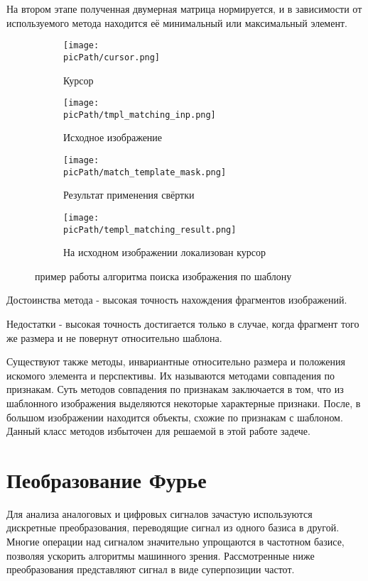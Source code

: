 \documentclass[oneside,final,14pt]{extreport}
\newcommand{\picPath}{pictures}
\begin{document}
На втором этапе полученная двумерная матрица нормируется, и в зависимости от используемого метода находится её минимальный или максимальный элемент.

\begin{figure}[H]
  \centering
  \begin{subfigure}[b]{0.2\linewidth}
    \texttt{[image: \\picPath/cursor.png]}
    \caption{ Курсор}
  \end{subfigure}
  \begin{subfigure}[b]{0.4\linewidth}
    \texttt{[image: \\picPath/tmpl\_matching\_inp.png]}
    \caption{Исходное изображение}
  \end{subfigure}
  \begin{subfigure}[b]{0.4\linewidth}
    \texttt{[image: \\picPath/match\_template\_mask.png]}
    \caption{Результат применения свёртки}
  \end{subfigure}
  \begin{subfigure}[b]{0.4\linewidth}
    \texttt{[image: \\picPath/templ\_matching\_result.png]}
    \caption{На исходном изображении локализован курсор}
  \end{subfigure}
  \caption{пример работы алгоритма поиска изображения по шаблону}
  \label{fig:coffee}
\end{figure}

Достоинства метода  - высокая точность нахождения фрагментов изображений.

Недостатки - высокая точность достигается только в случае, когда фрагмент того же размера и не повернут относительно шаблона. 
	
	Существуют также методы, инвариантные относительно размера и положения искомого элемента и перспективы. Их называются методами совпадения по признакам. Суть методов совпадения по признакам заключается в том, что из шаблонного изображения выделяются некоторые характерные признаки. После, в большом изображении находится объекты, схожие по признакам с шаблоном. Данный класс методов избыточен для решаемой в этой работе задече.
	
\chapter{Пеобразование Фурье}
Для анализа аналоговых и цифровых сигналов зачастую используются дискретные преобразования, переводящие сигнал из одного базиса в другой. Многие операции над сигналом значительно упрощаются в частотном базисе, позволяя ускорить алгоритмы машинного зрения. Рассмотренные ниже преобразования представляют сигнал в виде суперпозиции частот. 
\end{document}
